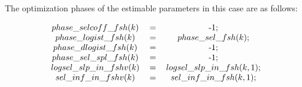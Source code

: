 \documentclass{article}
\begin{document}
\begin{itemize}
The optimization phases of the estimable parameters in this case are as follows:
\begin{table}[H]
    \centering
    \begin{equation}
    \begin{tabular}{c c c}
       $ phase\_selcoff\_fsh(k)$& = &-1;\\
        $phase\_logist\_fsh(k)$ &=& $phase\_sel\_fsh(k)$;\\
        $phase\_dlogist\_fsh(k)$ & =& -1;\\
        $phase\_sel\_spl\_fsh(k)$ & =& -1;\\

        $logsel\_slp\_in\_fshv(k)$ &=& $logsel\_slp\_in\_fsh(k,1)$;\\
           $sel\_inf\_in\_fshv(k) $& =&   $sel\_inf\_in\_fsh(k,1)$;
    \end{tabular}
    \end{equation}
    \label{tab: phase2}
\end{table}



\end{itemize}
\end{document}
